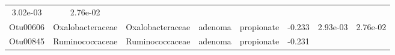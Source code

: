 \documentclass[11pt,]{article}
\begin{document}
\begin{longtable}[]{@{}cccccccc@{}}
\begin{minipage}[t]{0.08\columnwidth}
3.02e-03\strut
\end{minipage} & \begin{minipage}[t]{0.08\columnwidth}\centering\strut
2.76e-02\strut
\end{minipage}\tabularnewline
\begin{minipage}[t]{0.08\columnwidth}\centering\strut
Otu00606\strut
\end{minipage} & \begin{minipage}[t]{0.15\columnwidth}\centering\strut
Oxalobacteraceae\strut
\end{minipage} & \begin{minipage}[t]{0.15\columnwidth}\centering\strut
Oxalobacteraceae\strut
\end{minipage} & \begin{minipage}[t]{0.08\columnwidth}\centering\strut
adenoma\strut
\end{minipage} & \begin{minipage}[t]{0.09\columnwidth}\centering\strut
propionate\strut
\end{minipage} & \begin{minipage}[t]{0.07\columnwidth}\centering\strut
-0.233\strut
\end{minipage} & \begin{minipage}[t]{0.08\columnwidth}\centering\strut
2.93e-03\strut
\end{minipage} & \begin{minipage}[t]{0.08\columnwidth}\centering\strut
2.76e-02\strut
\end{minipage}\tabularnewline
\begin{minipage}[t]{0.08\columnwidth}\centering\strut
Otu00845\strut
\end{minipage} & \begin{minipage}[t]{0.15\columnwidth}\centering\strut
Ruminococcaceae\strut
\end{minipage} & \begin{minipage}[t]{0.15\columnwidth}\centering\strut
Ruminococcaceae\strut
\end{minipage} & \begin{minipage}[t]{0.08\columnwidth}\centering\strut
adenoma\strut
\end{minipage} & \begin{minipage}[t]{0.09\columnwidth}\centering\strut
propionate\strut
\end{minipage} & \begin{minipage}[t]{0.07\columnwidth}\centering\strut
-0.231\strut
\end{minipage} & \begin{minipage}[t]{0.08\columnwidth}\centering\strut

\end{minipage}
\end{longtable}
\end{document}
